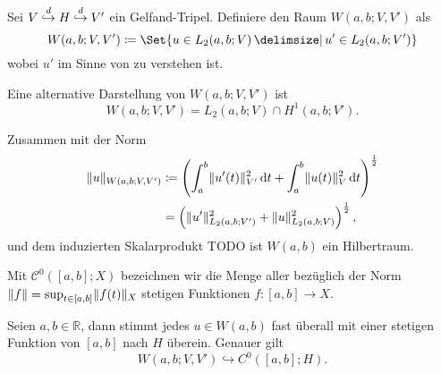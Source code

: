 \begin{Definition}
\label{definition:gl:bochner_raum_W}
    Sei $V \stackrel{d}{\hookrightarrow} H \stackrel{d}{\hookrightarrow} V'$ ein Gelfand-Tripel.
    Definiere den Raum $W(a, b; V, V')$ als
    \begin{equation}
        W(a, b; V, V') \deq \Set{u \in L_{2}(a, b; V) \given u' \in L_{2}(a, b; V')}
    \end{equation}
    wobei $u'$ im Sinne von  zu verstehen ist.
\end{Definition}

\begin{Bemerkung}
\label{bemerkung:gl:alternative_darstellung_bochner}
    Eine alternative Darstellung von $W(a, b; V, V')$ ist
    \begin{equation}
        W(a, b; V, V') = L_{2}(a, b; V) \cap H^{1}(a, b; V').
    \end{equation}
\end{Bemerkung}

\begin{Lemma}
    Zusammen mit der Norm
    \begin{equation}
        \begin{aligned}
            \lVert u\rVert_{W(a, b; V, V')}
            &\coloneqq \left( \int_{a}^{b} \lVert u'(t)\rVert_{V'}^{2} \mathop{}\!\mathrm{d} t + \int_{a}^{b} \lVert u(t)\rVert_{V}^{2} \mathop{}\!\mathrm{d} t \right)^{\frac 12}
            \\&= \left( \lVert u'\rVert_{L_{2}(a, b; V')}^{2} + \lVert u\rVert_{L_{2}(a, b; V)}^{2} \right)^{\frac 12},
        \end{aligned}
    \end{equation}
    und dem induzierten Skalarprodukt TODO ist $W(a, b)$ ein Hilbertraum.
\end{Lemma}

\begin{Definition}
\label{definition:gl:stetige_funktionen}
    Mit $\mathcal C^{0}([a, b]; X)$ bezeichnen wir die Menge aller bezüglich der Norm $\lVert f\rVert = \sup_{t \in [a, b]} \lVert f(t)\rVert_{X}$ stetigen Funktionen $f \colon [a, b] \to X$.
\end{Definition}

\begin{Satz}
\label{satz:gl:einbettung_bochner_stetig}
    Seien $a, b \in \mathbb{R}$, dann stimmt jedes $u \in W(a, b)$ fast überall mit einer stetigen Funktion von $[a, b]$ nach $H$ überein.
    Genauer gilt
    \begin{equation}
        W(a, b; V, V') \hookrightarrow C^{0}([a, b]; H).
    \end{equation}
\end{Satz}




